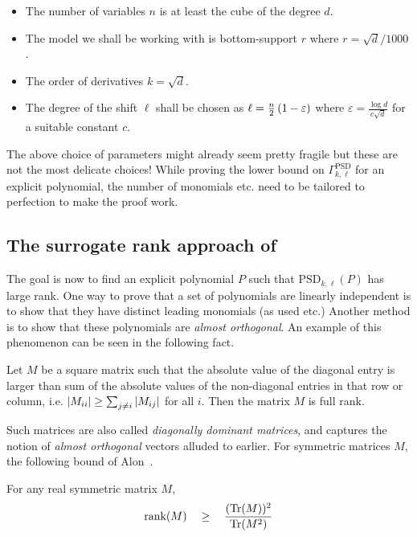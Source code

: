\documentclass[12pt]{report}
\newcommand{\rank}{\mathrm{rank}}
\renewcommand{\epsilon}{\varepsilon}
\begin{document}
\begin{itemize}
\item The number of variables $n$ is at least the cube of the degree $d$. 
\item The model we shall be working with is bottom-support $r$ where $r = \sqrt{d}/1000$. 
\item The order of derivatives $k = \sqrt{d}$. 
\item The degree of the shift $\ell$ shall be chosen as $\ell = \frac{n}{2}\inparen{1 - \epsilon}$ where $\epsilon = \frac{\log d}{c\sqrt{d}}$ for a suitable constant $c$. 
\end{itemize}

The above choice of parameters might already seem pretty fragile but these are not the most delicate choices! While proving the lower bound on $\Gamma^{\mathrm{PSD}}_{k,\ell}$ for an explicit polynomial, the number of monomials etc. need to be tailored to perfection to make the proof work. 

\subsection{The surrogate rank approach of \cite{KLSS}}

The goal is now to find an explicit polynomial $P$ such that $\mathrm{PSD}_{k,\ell}(P)$ has large rank. One way to prove that a set of polynomials are linearly independent is to show that they have distinct leading monomials (as used \cite{gkks13} etc.) Another method is to show that these polynomials are \emph{almost orthogonal}. An example of this phenomenon can be seen in the following fact. 

\begin{fact}
Let $M$ be a square matrix such that the absolute value of the diagonal entry is larger than sum of the absolute values of the non-diagonal entries in that row or column, i.e. $\left|M_{ii}\right| \geq \sum_{j\neq i} \left|M_{ij}\right|$ for all $i$. Then the matrix $M$ is full rank. 
\end{fact}

Such matrices are also called \emph{diagonally dominant matrices}, and captures the notion of \emph{almost orthogonal} vectors alluded to earlier. For symmetric matrices $M$, the following bound of Alon~\cite{Alo09}.

\begin{lemma}\label{lem:trace-bound} For any real symmetric matrix $M$, 
\[
\rank(M) \spaced{\geq} \frac{(\mathrm{Tr}(M))^2}{\mathrm{Tr}(M^2)}
\]
\end{lemma}
\end{document}
